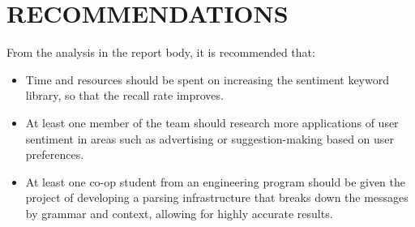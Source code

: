 \section{RECOMMENDATIONS} %
\label{sec:recommendations}
From the analysis in the report body, it is recommended that:\\

\begin{itemize}
	\item Time and resources should be spent on increasing the sentiment keyword library, so that the recall rate improves.
	
	\item At least one member of the team should research more applications of user sentiment in areas such as advertising or suggestion-making based on user preferences.
	
	\item At least one co-op student from an engineering program should be given the project of developing a parsing infrastructure that breaks down the messages by grammar and context, allowing for highly accurate results.
\end{itemize}
